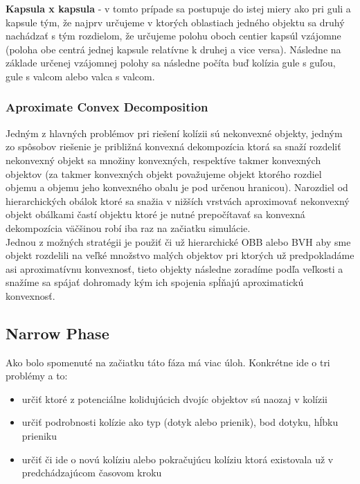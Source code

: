 \documentclass[a4paper]{article}
\begin{document}
	\textbf{Kapsula x kapsula} - v tomto prípade sa postupuje do istej miery ako pri guli a kapsule tým, že najprv určujeme v ktorých oblastiach jedného objektu sa druhý nachádzať s tým rozdielom, že určujeme polohu oboch centier kapsúl vzájomne (poloha obe centrá jednej kapsule relatívne k druhej a vice versa). Následne na základe určenej vzájomnej polohy sa následne počíta buď kolízia gule s guľou, gule s valcom alebo valca s valcom.
	
	\subsubsection{Aproximate Convex Decomposition}
	
	Jedným z hlavných problémov pri riešení kolízii sú nekonvexné objekty, jedným zo spôsobov riešenie je približná konvexná dekompozícia ktorá sa snaží rozdeliť nekonvexný objekt sa množiny konvexných, respektíve takmer konvexných objektov (za takmer konvexných objekt považujeme objekt ktorého rozdiel objemu a objemu jeho konvexného obalu je pod určenou hranicou). Narozdiel od hierarchických obálok ktoré sa snažia v nižších vrstvách aproximovať nekonvexný objekt obálkami častí objektu ktoré je nutné prepočítavať sa konvexná dekompozícia väčšinou robí iba raz na začiatku simulácie.
	\\
	
	Jednou z možných stratégii je použiť či už hierarchické OBB alebo BVH aby sme objekt rozdelili na veľké množstvo malých objektov pri ktorých už predpokladáme asi aproximatívnu konvexnosť, tieto objekty následne zoradíme podľa veľkosti a snažíme sa spájať dohromady kým ich spojenia spĺňajú aproximatickú konvexnosť.
	
	\subsection{Narrow Phase}  
	
	Ako bolo spomenuté na začiatku táto fáza má viac úloh. Konkrétne ide o tri problémy a to:
	\begin{itemize}
		\item určiť ktoré z potenciálne kolidujúcich dvojíc objektov sú naozaj v kolízii
		\item určiť podrobnosti kolízie ako typ (dotyk alebo prienik), bod dotyku, hĺbku prieniku
		\item určiť či ide o novú kolíziu alebo pokračujúcu kolíziu ktorá existovala už v predchádzajúcom časovom kroku  
	\end{itemize}
\end{document}
